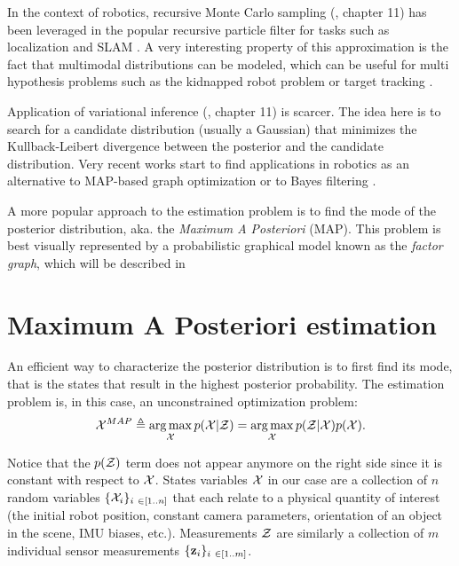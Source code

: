 In the context of robotics, recursive Monte Carlo sampling (\cite{koller2009probabilistic}, chapter 11) has been 
leveraged in the popular recursive particle filter for tasks such as localization \cite{dellaert1999monte} and SLAM \cite{montemerlo2002fastslam}. A very interesting
property of this approximation is the fact that multimodal distributions can be modeled, which can be useful
for multi hypothesis problems such as the kidnapped robot problem \cite{dellaert1999monte} or target tracking \cite{gustafsson2002particle}. 

Application of variational inference (\cite{koller2009probabilistic}, chapter 11) is scarcer. The idea here is to search for a candidate distribution 
(usually a Gaussian) that minimizes the Kullback-Leibert divergence between the posterior and the candidate distribution. Very recent works start 
to find applications in robotics as an alternative to MAP-based graph optimization \cite{barfoot2020exactly, wong2020variational} 
or to Bayes filtering \cite{lambert2022recursive}. 

A more popular approach to the estimation problem is to find the mode of the posterior distribution, aka. the \textit{Maximum A Posteriori} (MAP).
This problem is best visually represented by a probabilistic graphical model known as the \textit{factor graph}, which will be described in 



\section{Maximum A Posteriori estimation}
\label{sec:MAP}

An efficient way to characterize the posterior distribution is to first find its mode, that is the states that 
result in the highest posterior probability. The estimation problem is, in this case, an unconstrained optimization problem:
%
\begin{equation}
    \label{eq:MAP_pbe}
    \mathcal{X}^{MAP} \triangleq \operatorname*{arg\,max}_{\mathcal{X}} p(\mathcal{X} | \mathcal{Z}) = \operatorname*{arg\,max}_{\mathcal{X}} p(\mathcal{Z} | \mathcal{X}) p(\mathcal{X}).
\end{equation}
%

Notice that the $p(\mathcal{Z})$ term does not appear anymore on the right side since it is constant with respect to $\mathcal{X}$.
States variables $\mathcal{X}$ in our case are a collection of $n$ random variables $\{\cX_i\}_{i \in [1..n]}$ that each relate to a physical quantity of 
interest (\eg the initial robot position, constant camera parameters, orientation of an object in the scene, IMU biases, etc.). Measurements $\mathcal{Z}$ are 
similarly a collection of $m$ individual sensor measurements $\{\bfz_i\}_{i \in [1..m]}$.

